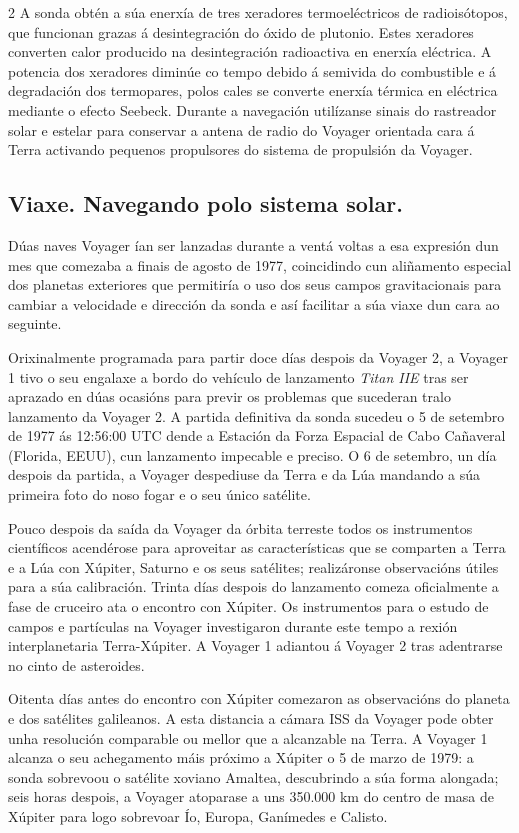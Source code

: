 \begin{refsection}
\begin{multicols}{2}
A sonda obtén a súa enerxía de tres xeradores termoeléctricos de radioisótopos,
que funcionan grazas á desintegración do óxido de plutonio. Estes xeradores
converten calor producido na desintegración radioactiva en enerxía eléctrica. A
potencia dos xeradores diminúe co tempo debido á semivida do combustible e á
degradación dos termopares, polos cales se converte enerxía térmica en
eléctrica mediante o efecto Seebeck. Durante a navegación utilízanse sinais do
rastreador solar e estelar para conservar a antena de radio do Voyager
orientada cara á Terra activando pequenos propulsores do sistema de propulsión
da Voyager.

\subsection*{Viaxe. Navegando polo sistema solar.}

Dúas naves Voyager ían ser lanzadas durante a ventá %
voltas a esa expresión dun mes que comezaba a finais de agosto de 1977,
coincidindo cun aliñamento especial  dos planetas exteriores que permitiría o
uso dos seus campos gravitacionais para cambiar a velocidade e dirección da
sonda e así facilitar a súa viaxe dun cara ao seguinte.

Orixinalmente programada para partir doce días despois da Voyager 2, a Voyager
1 tivo o seu engalaxe a bordo do vehículo de lanzamento \textit{Titan IIE} tras
ser aprazado en dúas ocasións para previr os problemas que sucederan tralo
lanzamento da Voyager 2. A partida definitiva da sonda sucedeu o 5 de setembro
de 1977 ás 12:56:00 UTC dende a Estación da Forza Espacial de Cabo Cañaveral
(Florida, EEUU), cun lanzamento impecable e preciso. O 6 de setembro, un día
despois da partida, a Voyager despediuse da Terra e da Lúa mandando a súa
primeira foto do noso fogar e o seu único satélite.

Pouco despois da saída da Voyager da órbita terreste todos os instrumentos
científicos acendérose para aproveitar as características que se comparten a
Terra e a Lúa con Xúpiter, Saturno e os seus satélites; realizáronse
observacións útiles para a súa calibración. Trinta días despois do lanzamento
comeza oficialmente a fase de cruceiro ata o encontro con Xúpiter. Os
instrumentos para o estudo de campos e partículas na Voyager investigaron
durante este tempo a rexión interplanetaria Terra-Xúpiter. A Voyager 1 adiantou
á Voyager 2 tras adentrarse no cinto de asteroides.

Oitenta días antes do encontro con Xúpiter comezaron as observacións do
planeta e dos satélites galileanos. A esta distancia a cámara ISS da Voyager
pode obter unha resolución comparable ou mellor que a alcanzable na Terra. A
Voyager 1 alcanza o seu achegamento máis próximo a Xúpiter o 5 de marzo de
1979: a sonda sobrevoou o satélite xoviano Amaltea, descubrindo a súa forma
alongada; seis horas despois, a Voyager atoparase a uns 350.000 km do centro de
masa de Xúpiter para logo sobrevoar Ío, Europa, Ganímedes e Calisto.


\end{multicols}
\end{refsection}
